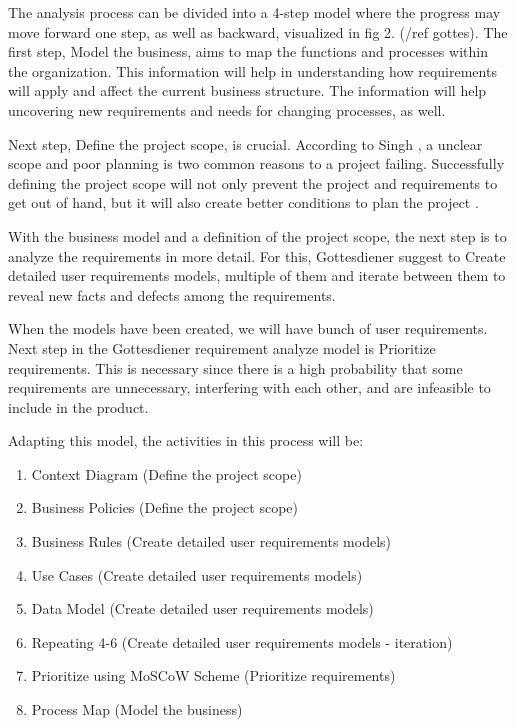 \documentclass[a4paper]{article}
\begin{document}
The analysis process can be divided into a 4-step model where the progress may move forward one step, as well as backward, visualized in fig 2. (/ref gottes). The first step, Model the business, aims to map the functions and processes within the organization. This information will help in understanding how requirements will apply and affect the current business structure. The information will help uncovering new requirements and needs for changing processes, as well.
 
Next step, Define the project scope, is crucial. According to Singh \cite{http://www.projectsmart.co.uk/rescuing-projects-in-crisis.html}, a unclear scope and poor planning is two common reasons to a project failing. Successfully defining the project scope will not only prevent the project and requirements to get out of hand, but it will also create better conditions to plan the project \cite{got. p. 127}. 

With the business model and a definition of the project scope, the next step is to analyze the requirements in more detail. For this, Gottesdiener suggest to Create detailed user requirements models, multiple of them and iterate between them to reveal new facts and defects among the requirements.
        
When the models have been created, we will have bunch of user requirements. Next step in the Gottesdiener requirement analyze model is Prioritize requirements. This is necessary since there is a high probability that some requirements are unnecessary, interfering with each other, and are infeasible to include in the product\cite{Lecture 5}.  

Adapting this model, the activities in this process will be:
\begin{enumerate}
\item Context Diagram (Define the project scope)
\item Business Policies (Define the project scope)
\item Business Rules (Create detailed user requirements models)
\item Use Cases (Create detailed user requirements models)
\item Data Model (Create detailed user requirements models)
\item Repeating 4-6 (Create detailed user requirements models - iteration)
\item Prioritize using MoSCoW Scheme (Prioritize requirements)
\item Process Map (Model the business) 
\end{enumerate}
\end{document}
